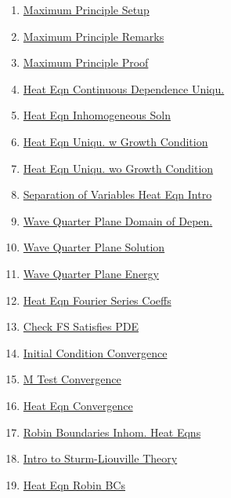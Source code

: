\documentclass[11pt]{article}
\begin{document}
\begin{multicols}{2}
\begin{enumerate}
		\item  \href{https://mp.weixin.qq.com/s/yWwTElTwX35L07JFyDrn9Q}{Maximum Principle Setup} %
		\item  \href{https://mp.weixin.qq.com/s/KfbwcVxIx9IJjr9e0CBjaQ}{Maximum Principle  Remarks} %
		\item  \href{https://mp.weixin.qq.com/s/1ZjzRrlJadi7UpPVqgtp7g}{Maximum Principle  Proof} %
		\item  \href{https://mp.weixin.qq.com/s/c-x6z8A5jVMX3UWS-e_meA}{Heat Eqn Continuous Dependence Uniqu.} %
		\item  \href{https://mp.weixin.qq.com/s/jYkHttkADPrxhmfIE-ERig}{Heat Eqn Inhomogeneous Soln} %
		\item  \href{https://mp.weixin.qq.com/s/ZPRqhnYIIDceQn6WysxIyg}{Heat Eqn Uniqu. w Growth Condition} %
		\item  \href{https://mp.weixin.qq.com/s/7gML9OE5gOD8CEaaITZK4A}{Heat Eqn Uniqu. wo Growth Condition} %
		\item  \href{https://mp.weixin.qq.com/s/EeYbWFNEYWY9Bkzcg6Gtcw}{Separation of Variables Heat Eqn Intro} %
		\item  \href{https://mp.weixin.qq.com/s/1NtUgsh2vNWGv43P_Qc-yA}{Wave Quarter Plane Domain of Depen.} %
		\item  \href{https://mp.weixin.qq.com/s/AVZUvZfQf5JHI5hHHonqcg}{Wave Quarter Plane Solution} %
		\item  \href{https://mp.weixin.qq.com/s/TNoKVaJjKr9jlLHLwDkViA}{Wave Quarter Plane Energy} %
		\item  \href{https://mp.weixin.qq.com/s/_DthNcAyy2aYMhva0s6liQ}{Heat Eqn Fourier Series Coeffs} %
		\item  \href{https://mp.weixin.qq.com/s/eqq9b8wdcINiyVuawh4YzA}{Check FS Satisfies PDE} %
		\item  \href{https://mp.weixin.qq.com/s/3XqBu4QuBtMAHv1WSytllA}{Initial Condition Convergence} %
		\item  \href{https://mp.weixin.qq.com/s/Kc__pDQr9RAHs8dqYP3v5A}{M Test Convergence} %
		\item  \href{https://mp.weixin.qq.com/s/4n3d8wBDMONwke-yI_DY6w}{Heat Eqn Convergence} %
		\item  \href{https://mp.weixin.qq.com/s/GEfEfVt0XxX6cEo9Do2ffQ}{Robin Boundaries Inhom. Heat Eqns} %
		\item  \href{https://mp.weixin.qq.com/s/3TFRoQhbiVf7SSlgkA8n4g}{Intro to Sturm-Liouville Theory} %
		\item  \href{https://mp.weixin.qq.com/s/4rklnh-g0FsISxseQBg0tA}{Heat Eqn  Robin BCs} %

\end{enumerate}
\end{multicols}
\end{document}
